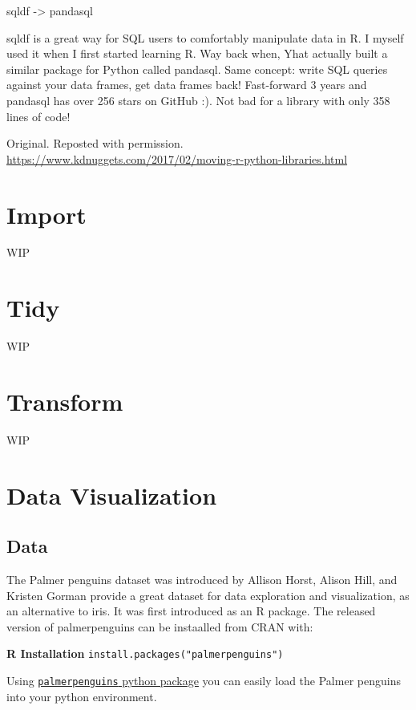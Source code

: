 \documentclass[]{book}
\begin{document}
sqldf -\textgreater{} pandasql

sqldf is a great way for SQL users to comfortably manipulate data in R. I myself used it when I first started learning R. Way back when, Yhat actually built a similar package for Python called pandasql. Same concept: write SQL queries against your data frames, get data frames back! Fast-forward 3 years and pandasql has over 256 stars on GitHub :). Not bad for a library with only 358 lines of code!

Original. Reposted with permission.
\url{https://www.kdnuggets.com/2017/02/moving-r-python-libraries.html}

\hypertarget{import}{%
\chapter{Import}\label{import}}

WIP

\hypertarget{tidy}{%
\chapter{Tidy}\label{tidy}}

WIP

\hypertarget{transform}{%
\chapter{Transform}\label{transform}}

WIP

\hypertarget{data-visualization}{%
\chapter{Data Visualization}\label{data-visualization}}

\hypertarget{data}{%
\section{Data}\label{data}}

The Palmer penguins dataset was introduced by Allison Horst, Alison Hill, and Kristen Gorman provide a great dataset for data exploration and visualization, as an alternative to iris. It was first introduced as an R package. The released version of palmerpenguins can be instaalled from CRAN with:

\textbf{R Installation}
\texttt{install.packages("palmerpenguins")}

Using \href{https://pypi.org/project/palmerpenguins/}{\texttt{palmerpenguins} python package} you can easily load the Palmer penguins into your python environment.
\end{document}
